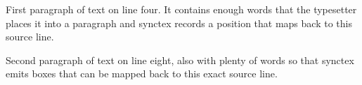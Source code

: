 \documentclass{article}
\begin{document}
First paragraph of text on line four. It contains enough words that the
typesetter places it into a paragraph and synctex records a position that
maps back to this source line.

Second paragraph of text on line eight, also with plenty of words so that
synctex emits boxes that can be mapped back to this exact source line.
\end{document}
